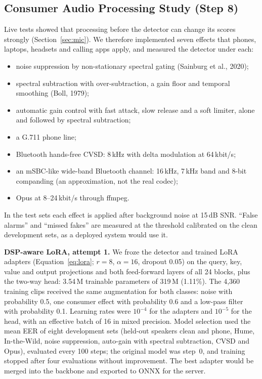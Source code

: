 \documentclass[10pt,a4paper,twocolumn]{article}
\begin{document}
\subsection{Consumer Audio Processing Study (Step 8)}
\label{sec:dsp}
Live tests showed that processing before the detector can change its scores strongly (Section~\ref{sec:mic}). We therefore implemented seven effects that phones, laptops, headsets and calling apps apply, and measured the detector under each:
\begin{itemize}\setlength\itemsep{0pt}
\item noise suppression by non-stationary spectral gating (Sainburg et al., 2020);
\item spectral subtraction with over-subtraction, a gain floor and temporal smoothing (Boll, 1979);
\item automatic gain control with fast attack, slow release and a soft limiter, alone and followed by spectral subtraction;
\item a G.711 phone line;
\item Bluetooth hands-free CVSD: 8\,kHz with delta modulation at 64\,kbit/s;
\item an mSBC-like wide-band Bluetooth channel: 16\,kHz, 7\,kHz band and 8-bit companding (an approximation, not the real codec);
\item Opus at 8--24\,kbit/s through ffmpeg.
\end{itemize}
In the test sets each effect is applied after background noise at 15\,dB SNR. ``False alarms'' and ``missed fakes'' are measured at the threshold calibrated on the clean development sets, as a deployed system would use it.

\textbf{DSP-aware LoRA, attempt 1.} We froze the detector and trained LoRA adapters (Equation~\ref{eq:lora}; $r=8$, $\alpha=16$, dropout 0.05) on the query, key, value and output projections and both feed-forward layers of all 24 blocks, plus the two-way head: 3.54\,M trainable parameters of 319\,M (1.11\%). The 4,360 training clips received the same augmentation for both classes: noise with probability 0.5, one consumer effect with probability 0.6 and a low-pass filter with probability 0.1. Learning rates were $10^{-4}$ for the adapters and $10^{-5}$ for the head, with an effective batch of 16 in mixed precision. Model selection used the mean EER of eight development sets (held-out speakers clean and phone, Hume, In-the-Wild, noise suppression, auto-gain with spectral subtraction, CVSD and Opus), evaluated every 100 steps; the original model was step~0, and training stopped after four evaluations without improvement. The best adapter would be merged into the backbone and exported to ONNX for the server.
\end{document}
